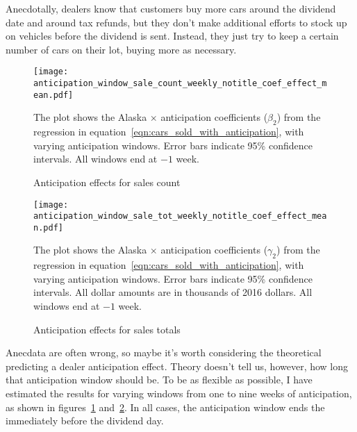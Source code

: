 \documentclass[11pt,letterpaper,oneside]{article}
\newcommand{\snippet}[1]{\hspace{-0.15em}}
\begin{document}
Anecdotally, dealers know that customers buy more cars around the dividend date and around tax refunds, but they don't make additional efforts to stock up on vehicles before the dividend is sent.
Instead, they just try to keep a certain number of cars on their lot, buying more as necessary.

\begin{figure}[hbt]
    \caption{Anticipation effects for sales count}
    \label{fig:anticipation_window_sale_count}
    \texttt{[image: anticipation\_window\_sale\_count\_weekly\_notitle\_coef\_effect\_mean.pdf]}

    {\footnotesize
    The plot shows the Alaska $\times$ anticipation coefficients ($\beta_2$) from the regression in equation~\ref{eqn:cars_sold_with_anticipation}, with varying anticipation windows.
    Error bars indicate 95\% confidence intervals.
    All windows end at $-1$ week.
    }

\end{figure}
\begin{figure}[hbt]
     \caption{Anticipation effects for sales totals}
     \label{fig:anticipation_window_sale_tot}
        \texttt{[image: anticipation\_window\_sale\_tot\_weekly\_notitle\_coef\_effect\_mean.pdf]}

    {\footnotesize
    The plot shows the Alaska $\times$ anticipation coefficients ($\gamma_2$) from the regression in equation~\ref{eqn:cars_sold_with_anticipation}, with varying anticipation windows.
    Error bars indicate 95\% confidence intervals.
    All dollar amounts are in thousands of 2016 dollars.
    All windows end at $-1$ week.
    }
\end{figure}


Anecdata are often wrong, so maybe it's worth considering the theoretical predicting a dealer anticipation effect.
Theory doesn't tell us, however, how long that anticipation window should be.
To be as flexible as possible, I have estimated the results for varying windows from one to nine weeks of anticipation, as shown in figures~\ref{fig:anticipation_window_sale_count} and~\ref{fig:anticipation_window_sale_tot}.
In all cases, the anticipation window ends the immediately before the dividend day.
\end{document}
